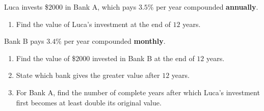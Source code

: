 \documentclass[12pt, twoside]{article}
\begin{document}
\begin{enumerate}[itemsep=0.15cm]
Luca invests \$$2000$ in Bank A, which pays $3.5\%$ per year
compounded \textbf{annually}.

\begin{enumerate}[itemsep=0.1cm]
  \item Find the value of Luca's investment at the end of $12$ years.
\end{enumerate}

Bank B pays $3.4\%$ per year compounded \textbf{monthly}.

\begin{enumerate}[itemsep=0.1cm]
  \item[(b)] Find the value of \$$2000$ invested in Bank B at the end
  of $12$ years.
  \item[(c)] State which bank gives the greater value after $12$ years.
  \item[(d)] For Bank A, find the number of complete years after which
  Luca's investment first becomes at least double its original value.
\end{enumerate}


\end{enumerate}
\end{document}

